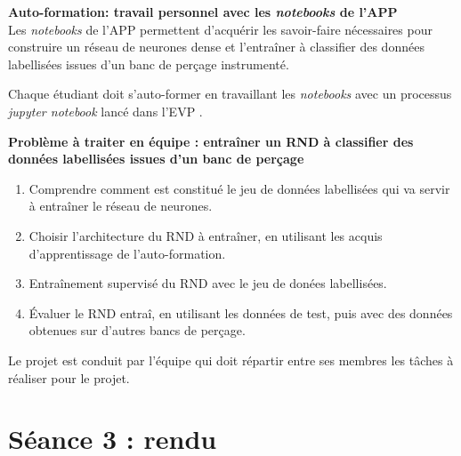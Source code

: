 \documentclass[11pt,french]{article}
\begin{document}
\begin {bclogo}[noborder=true, couleurBarre=Chocolate, logo=\bctrombone]{}
  \vspace*{-4mm}\textbf{Auto-formation: travail personnel avec les {\em notebooks} de l'APP}\\[-2mm]

  Les {\em notebooks} de l'APP permettent d'acquérir les savoir-faire nécessaires pour construire un réseau de neurones dense
  et l'entraîner à classifier des données labellisées issues d'un banc de perçage instrumenté.

Chaque étudiant doit s'auto-former en travaillant les {\em notebooks} avec un processus {\em jupyter notebook} lancé dans l'EVP .
\end{bclogo}  

\begin {bclogo}[noborder=true, couleurBarre=Chocolate, logo=\bctrombone]{}
  \vspace*{-4mm}\textbf{Problème à traiter en équipe : entraîner un RND à classifier des données labellisées issues d'un banc de perçage}\\[-2mm]

\begin{enumerate}
\item Comprendre comment est constitué le jeu de données labellisées qui va servir à entraîner le réseau de neurones.
\item Choisir l'architecture du RND à entraîner, en utilisant les acquis d'apprentissage de l'auto-formation.
\item Entraînement supervisé du RND avec le jeu de donées labellisées.
\item Évaluer le RND entraî, en utilisant les données de test, puis avec des données obtenues sur d'autres bancs de perçage.
\end{enumerate}

Le projet est conduit par l'équipe qui doit répartir entre ses membres les tâches à réaliser pour le projet.
\end{bclogo}  

\newpage
\vspace*{-16mm}
\section*{ Séance 3 : rendu}
\end{document}
